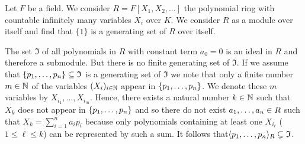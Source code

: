 \begin{exam}
Let $F$ be a field. We consider $R=F[X_1,X_2,\ldots]$ the polynomial ring with countable infinitely many variables $X_i$ over $K$. We consider $R$ as a module over itself and find that $\lbrace 1\rbrace$ is a generating set of $R$ over itself.

The set $\mathfrak{I}$ of all polynomials in $R$ with constant term $a_0=0$ is an ideal in $R$ and therefore a submodule. But there is no finite generating set of $\mathfrak{I}$. If we assume that $\lbrace p_{1},\ldots,p_{n}\rbrace\subseteq \mathfrak{I}$ is a generating set of $\mathfrak{I}$ we note that only a finite number $m\in\operatorname{\mathbb{N}}$ of the variables $(X_i)_{i\in\operatorname{\mathbb{N}}}$ appear in $\lbrace p_{1},\ldots,p_{n}\rbrace$. We denote these $m$ variables by $X_{i_1},\ldots,X_{i_m}$. Hence, there exists a natural number $k\in\operatorname{\mathbb{N}}$ such that $X_k$ does not appear in $\lbrace p_{1},\ldots,p_{n}\rbrace$ and so there do not exist $a_{1},\ldots,a_{n}\in R$ such that $X_k=\sum_{i=1}^n a_ip_i$ because only polynomials containing at least one $X_{i_\ell}$ ($1\leq\ell\leq k$) can be represented by such a sum. It follows that$\langle p_{1},\ldots,p_{n}\rangle_R\subsetneq \mathfrak{I}$.
\end{exam}